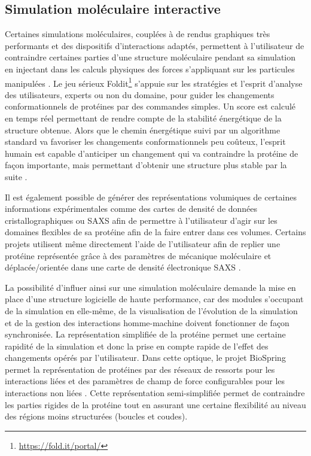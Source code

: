 \subsection{Simulation moléculaire interactive} \label{simu_interactive}

Certaines simulations moléculaires, couplées à de rendus graphiques très performants et des dispositifs d'interactions adaptés, permettent à l'utilisateur de contraindre certaines parties d'une structure moléculaire pendant sa simulation en injectant dans les calculs physiques des forces s'appliquant sur les particules manipulées \cite{bolopion_comparing_2010}. Le jeu sérieux Foldit\footnote{\url{https://fold.it/portal/}} s'appuie sur les stratégies et l'esprit d'analyse des utilisateurs, experts ou non du domaine, pour guider les changements conformationnels de protéines par des commandes simples. Un score est calculé en temps réel permettant de rendre compte de la stabilité énergétique de la structure obtenue. Alors que le chemin énergétique suivi par un algorithme standard va favoriser les changements conformationnels peu coûteux, l'esprit humain est capable d'anticiper un changement qui va contraindre la protéine de façon importante, mais permettant d'obtenir une structure plus stable par la suite \cite{khatib2011crystal}.

Il est également possible de générer des représentations volumiques de certaines informations expérimentales comme des cartes de densité de données cristallographiques ou SAXS afin de permettre à l'utilisateur d'agir sur les domaines flexibles de sa protéine afin de la faire entrer dans ces volumes. Certains projets utilisent même directement l'aide de l'utilisateur afin de replier une protéine représentée grâce à des paramètres de mécanique moléculaire et déplacée/orientée dans une carte de densité électronique SAXS \cite{molza2014innovative,tek2012advances}.

La possibilité d'influer ainsi sur une simulation moléculaire demande la mise en place d'une structure logicielle de haute performance, car des modules s'occupant de la simulation en elle-même, de la visualisation de l'évolution de la simulation et de la gestion des interactions homme-machine doivent fonctionner de façon synchronisée.
La représentation simplifiée de la protéine permet une certaine rapidité de la simulation et donc la prise en compte rapide de l'effet des changements opérés par l'utilisateur. Dans cette optique, le projet BioSpring permet la représentation de protéines par des réseaux de ressorts pour les interactions liées et des paramètres de champ de force configurables pour les interactions non liées \cite{ferey2012biospring}. Cette représentation semi-simplifiée permet de contraindre les parties rigides de la protéine tout en assurant une certaine flexibilité au niveau des régions moins structurées (boucles et coudes).

